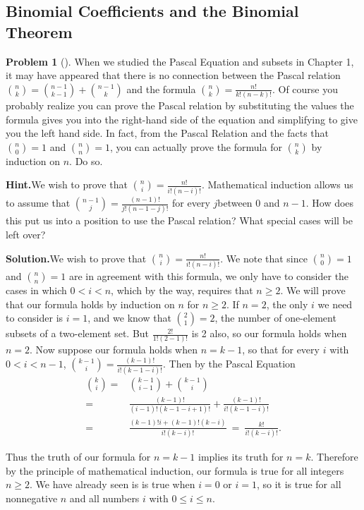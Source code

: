 \documentclass[10pt,]{book}
\theoremstyle{plain}
\theoremstyle{definition}
\newtheorem{activity}[project]{Problem}
\theoremstyle{definition}
\numberwithin{equation}{chapter}
\newcommand{\lt}{<}
\newcommand{\amp}{&}
\begin{document}
\subsection[{Binomial Coefficients and the Binomial Theorem}]{Binomial Coefficients and the Binomial Theorem}\label{subsection-6}
\begin{activity}[]\label{activity-72}
When we studied the Pascal Equation and subsets in Chapter 1, it may have appeared that there is no connection between the Pascal relation \(\binom{n}{k} = \binom{n-1}{k-1} +\binom{n-1}{k}\) and the formula \(\binom{n}{k}=\frac{n!}{k!(n-k)!}\). Of course you probably realize you can prove the Pascal relation by substituting the values the formula gives you into the right-hand side of the equation and simplifying to give you the left hand side. In fact, from the Pascal Relation and the facts that \(\binom{n}{0}=1\) and \(\binom{n}{n}=1\), you can actually prove the formula for \(\binom{n}{k}\) by induction on \(n\). Do so.%
\par\medskip\noindent%
\textbf{Hint.}\quad We wish to prove that \(\binom{n}{i} =\frac{n!}{i!(n-i)!}\). Mathematical induction allows us to assume that \(\binom{n-1}{j}=\frac{(n-1)!}{j! (n-1-j)!}\) for every \(j\)between 0 and \(n-1\). How does this put us into a position to use the Pascal relation? What special cases will be left over?%
\par\medskip\noindent%
\textbf{Solution.}\quad We wish to prove that \(\binom{n}{i} =\frac{n!}{i!(n-i)!}\). We note that since \(\binom{n}{0}=1\) and \(\binom{n}{n} =1\) are in agreement with this formula, we only have to consider the cases in which \(0\lt i\lt n\), which by the way, requires that \(n\ge 2\). We will prove that our formula holds by induction on \(n\) for \(n\ge 2\). If \(n=2\), the only \(i\) we need to consider is \(i=1\), and we know that \(\binom{2}{1}=2\), the number of one-element subsets of a two-element set. But \(\frac{2!}{1!(2-1)!}\) is 2 also, so our formula holds when \(n=2\). Now suppose our formula holds when \(n=k-1\), so that for every \(i\) with \(0\lt i\lt n-1\), \(\binom{k-1}{i} =
\frac{(k-1)!}{i!(k-1-i)!}\). Then by the Pascal Equation%
\begin{align*}
\binom{k}{i} =\amp \binom{k-1}{i-1}+\binom{k-1}{i}\\
=\amp
\frac{(k-1)!}{(i-1)!(k-1-i+1)!} + \frac{(k-1)!}{i!(k-1-i)!}\\
=\amp \frac{(k-1)!i+(k-1)!(k-i)}{i!(k-i)!} \ =\  \frac{k!}{i!(k-i)!}.
\end{align*}
%
\par
Thus the truth of our formula for \(n=k-1\) implies its truth for \(n=k\). Therefore by the principle of mathematical induction, our formula is true for all integers \(n\ge 2\). We have already seen is is true when \(i=0\) or \(i=1\), so it is true for all nonnegative \(n\) and all numbers \(i\) with \(0\le i\le n\).%
\end{activity}
\end{document}
